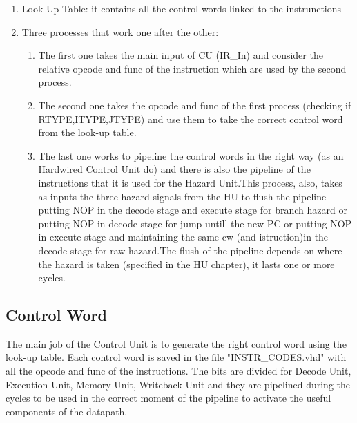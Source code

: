 \begin{enumerate} 
    \item Look-Up Table: it contains all the control words linked to the instrunctions
    \item Three processes that work one after the other:
    \begin{enumerate}
    \item The first one takes the main input of CU (IR\_In) and consider the relative opcode and func of the instruction which are used by the second process.
    \item The second one takes the opcode and func of the first process (checking if RTYPE,ITYPE,JTYPE) and use them to take the correct control word from the look-up table.
    \item The last one works to pipeline the control words in the right way (as an Hardwired Control Unit do) and there is also the pipeline of the instructions that it is used for the Hazard Unit.This process, also, takes as inputs the three hazard signals from the HU to flush the pipeline putting NOP in the decode stage and execute stage for branch hazard or putting NOP in decode stage for jump untill the new PC or putting NOP in execute stage and maintaining the same cw (and istruction)in the decode stage for raw hazard.The flush of the pipeline depends on where the hazard is taken (specified in the HU chapter), it lasts one or more cycles. 
    \end{enumerate}
\end{enumerate}
\subsection{Control Word}
The main job of the Control Unit is to generate the right control word using the look-up table. Each control word is saved in the file "INSTR\_CODES.vhd" with all the opcode and func of the instructions.
The bits are divided for Decode Unit, Execution Unit, Memory Unit, Writeback Unit and they are pipelined during the cycles to be used in the correct moment of the pipeline to activate the useful components of the datapath.

